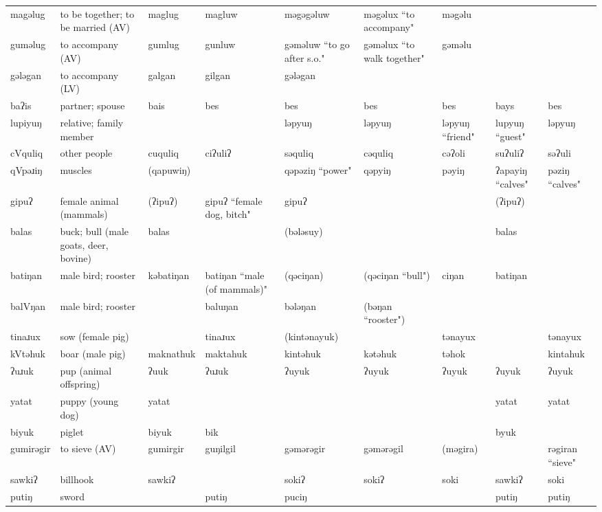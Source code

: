 \begin{landscape}
\begin{longtable}{*{9}{p{}}}
\text{*}magəlug & to be together; to be married (AV) & maglug & magluw & məgəgəluw & məgəlux ``to accompany" & məgəlu &  & \\
\text{*}guməlug & to accompany (AV) & gumlug & gunluw & gəməluw ``to go after s.o." & gəməlux ``to walk together" & gəməlu &  & \\
\text{*}gələgan & to accompany (LV) & galgan & gilgan & gələgan &  &  &  & \\
\text{*}baʔis & partner; spouse & bais & bes & bes & bes & bes & bays & bes\\
\text{*}lupiyuŋ & relative; family member &  &  & ləpyuŋ & ləpyuŋ & ləpyuŋ ``friend" & lupyuŋ ``guest" & ləpyuŋ\\
\text{*}cVquliq & other people & cuquliq & ciʔuliʔ & səquliq & cəquliq & cəʔoli & suʔuliʔ & səʔuli\\
\text{*}qVpəɹiŋ & muscles & (qapuwiŋ) &  & qəpəziŋ ``power" & qəpyiŋ & pəyiŋ & ʔapayiŋ ``calves" & pəziŋ ``calves"\\
\text{*}gipuʔ & female animal (mammals) & (ʔipuʔ) & gipuʔ ``female dog, bitch" & gipuʔ &  &  & (ʔipuʔ) & \\
\text{*}balas & buck; bull (male goats, deer, bovine) & balas &  & (bələsuy) &  &  & balas & \\
\text{*}batiŋan & male bird; rooster & kəbatiŋan & batiŋan ``male (of mammals)" & (qəciŋan) & (qəciŋan ``bull") & ciŋan & batiŋan & \\
\text{*}balVŋan & male bird; rooster &  & baluŋan & bələŋan & (bəŋan ``rooster") &  &  & \\
\text{*}tinaɹux & sow (female pig) &  & tinaɹux & (kintənayuk) &  & tənayux &  & tənayux\\
\text{*}kVtəhuk & boar (male pig) & maknathuk & maktahuk & kintəhuk & kətəhuk & təhok &  & kintahuk\\
\text{*}ʔuɹuk & pup (animal offspring) & ʔuuk & ʔuɹuk & ʔuyuk & ʔuyuk & ʔuyuk & ʔuyuk & ʔuyuk\\
\text{*}yatat & puppy (young dog) & yatat &  &  &  &  & yatat & yatat\\
\text{*}biyuk & piglet & biyuk & bik &  &  &  & byuk & \\
\text{*}gumirəgir & to sieve (AV) & gumirgir & guŋilgil & gəmərəgir & gəmərəgil & (məgira) &  & rəgiran ``sieve"\\
\text{*}sawkiʔ & billhook & sawkiʔ &  & sokiʔ & sokiʔ & soki & sawkiʔ & soki\\
\text{*}putiŋ & sword &  & putiŋ & puciŋ &  &  & putiŋ & putiŋ\\

\end{longtable}
\end{landscape}
